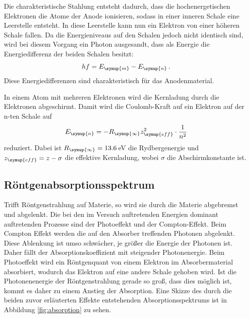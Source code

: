Die charakteristische Stahlung entsteht dadurch, dass die hochenergetischen Elektronen
die Atome der Anode ionisieren, sodass in einer inneren Schale eine Leerstelle entsteht.
In diese Leerstelle kann nun ein Elektron von einer höheren Schale fallen. Da die
Energieniveaus auf den Schalen jedoch nicht identisch sind, wird bei diesem Vorgang
ein Photon ausgesandt, dass als Energie die Energiedifferenz der beiden Schalen besitzt:
\begin{equation}
  hf=E_{\symup{m}}-E_{\symup{n}} \,.
\end{equation}
Diese Energiedifferenzen sind charakteristisch für das Anodenmaterial.

In einem Atom mit mehreren Elektronen wird die Kernladung durch die Elektronen
abgeschirmt. Damit wird die Coulomb-Kraft auf ein Elektron auf der n-ten Schale auf
\begin{equation}
  E_{\symup{n}}=-R_{\symup{\infty}} z_{\symup{eff}}^2 \cdot \frac{1}{n^2}
  \label{eqn:bindungsenergie}
\end{equation}
reduziert. Dabei ist $R_{\symup{\infty}}=13.6\,$eV die Rydbergenergie und
$z_{\symup{eff}}=z-\sigma$ die effektive Kernladung, wobei $\sigma$ die
Abschirmkonstante ist.



\subsection{Röntgenabsorptionsspektrum}
\label{sec:Theorie_absorption}

Trifft Röntgenstrahlung auf Materie, so wird sie durch die Materie abgebremst und
abgelenkt. Die bei den im Versuch auftretenden Energien dominant auftretenden
Prozesse sind der Photoeffekt und der Compton-Effekt.
Beim Compton Effekt werden die auf den Absorber treffenden Photonen abgelenkt.
Diese Ablenkung ist umso schwächer, je größer die Energie der Photonen ist. Daher
fällt der Absorptionskoeffizient mit steigender Photonenergie.
Beim Photoeffekt wird ein Röntgenquant von einem Elektron im Absorbermaterial absorbiert,
wodurch das Elektron auf eine andere Schale gehoben wird. Ist die Photonenenergie der
Röntgenstrahlung gerade so groß, dass dies möglich ist, kommt es daher zu einem
Anstieg der Absorption.
Eine Skizze des durch die beiden zuvor erläuterten Effekte entstehenden Absorptionsspektrums
ist in Abbildung \ref{fig:absorption} zu sehen.

